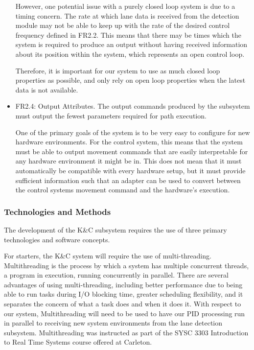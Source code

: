 \documentclass[titlepage]{article}
\begin{document}
\begin{itemize}
	However, one potential issue with a purely closed loop system is due to a timing concern. The rate at which lane data is received from the detection module may not be able to keep up with the rate of the desired control frequency defined in FR2.2. This means that there may be times which the system is required to produce an output without having received information about its position within the system, which represents an open control loop.

	Therefore, it is important for our system to use as much closed loop properties as possible, and only rely on open loop properties when the latest data is not available.
	
	\item FR2.4: Output Attributes. The output commands produced by the subsystem must output the fewest parameters required for path execution.
	
	One of the primary goals of the system is to be very easy to configure for new hardware environments. For the control system, this means that the system must be able to output movement commands that are easily interpretable for any hardware environment it might be in. This does not mean that it must automatically be compatible with every hardware setup, but it must provide sufficient information such that an adapter can be used to convert between the control systems movement command and the hardware's execution.
\end{itemize}


\subsubsection{Technologies and Methods}
The development of the K\&C subsystem requires the use of three primary technologies and software concepts. 

For starters, the K\&C system will require the use of multi-threading. Multithreading is the process by which a system has multiple concurrent threads, a program in execution, running concurrently in parallel. There are several advantages of using multi-threading, including better performance due to being able to run tasks during I/O blocking time, greater scheduling flexibility, and it separates the concern of what a task does and when it does it. With respect to our system, Multithreading will need to be used to have our PID processing run in parallel to receiving new system environments from the lane detection subsystem. Multithreading was instructed as part of the SYSC 3303 Introduction to Real Time Systems course offered at Carleton. 
\end{document}
